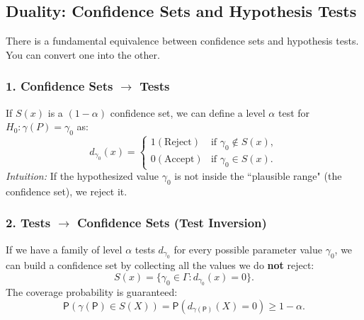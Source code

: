 \subsection{Duality: Confidence Sets and Hypothesis Tests}

There is a fundamental equivalence between confidence sets and hypothesis tests. You can convert one into the other.

\subsubsection{1. Confidence Sets $\to$ Tests}
If $S(x)$ is a $(1-\alpha)$ confidence set, we can define a level $\alpha$ test for $H_0: \gamma(P) = \gamma_0$ as:
\[
d_{\gamma_0}(x) = \begin{cases} 
1 (\text{Reject}) & \text{if } \gamma_0 \notin S(x), \\ 
0 (\text{Accept}) & \text{if } \gamma_0 \in S(x). 
\end{cases}
\]
\textit{Intuition:} If the hypothesized value $\gamma_0$ is not inside the ``plausible range" (the confidence set), we reject it.

\subsubsection{2. Tests $\to$ Confidence Sets (Test Inversion)}
If we have a family of level $\alpha$ tests $d_{\gamma_0}$ for every possible parameter value $\gamma_0$, we can build a confidence set by collecting all the values we do \textbf{not} reject:
\[
S(x) = \{ \gamma_0 \in \Gamma : d_{\gamma_0}(x) = 0 \}.
\]
The coverage probability is guaranteed:
\[
\mathsf{P}(\gamma(\mathsf{P}) \in S(X)) = \mathsf{P}(d_{\gamma(\mathsf{P})}(X) = 0) \ge 1 - \alpha.
\]
